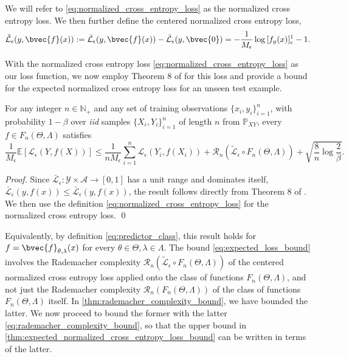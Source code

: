 \documentclass[runningheads, envcountsame, a4paper]{llncs}
\begin{document}
			We will refer to \eqref{eq:normalized_cross_entropy_loss} as the normalized cross entropy loss. We then further define the centered normalized cross entropy loss,
			\begin{equation}
				\tilde{\mathcal{L}}_{\epsilon}(y, \bvec{f}(x)) := \bar{\mathcal{L}}_{\epsilon}(y, \bvec{f}(x)) - \bar{\mathcal{L}}_{\epsilon}(y, \bvec{0}) = - \frac{1}{M_{\epsilon}} \log{ [f_{y}(x)]_{\epsilon}^{1} } - 1.
			\label{eq:centered_normalized_cross_entropy_loss}
			\end{equation}
			
			With the normalized cross entropy loss \eqref{eq:normalized_cross_entropy_loss} as our loss function, we now employ Theorem 8 of \cite{bartlett2002rademacher} for this loss and provide a bound for the expected normalized cross entropy loss for an unseen test example.
			
			\begin{lemma}
				\label{thm:expected_normalized_cross_entropy_loss_bound}
				For any integer $n \in \mathbb{N}_{+}$ and any set of training observations $\{x_{i}, y_{i}\}_{i = 1}^{n}$, with probability $1 - \beta$ over \textit{iid} samples $\{X_{i}, Y_{i}\}_{i = 1}^{n}$ of length $n$ from $\mathbb{P}_{X Y}$, every $f \in F_{n}(\Theta, \Lambda)$ satisfies
				\begin{equation}
					\frac{1}{M_{\epsilon}} \mathbb{E}[\mathcal{L}_{\epsilon}(Y, f(X))] \leq \frac{1}{n M_{\epsilon}} \sum_{i = 1}^{n} \mathcal{L}_{\epsilon}(Y_{i}, f(X_{i})) + \mathcal{R}_{n}(\tilde{\mathcal{L}}_{\epsilon} \circ F_{n}(\Theta, \Lambda)) + \sqrt{\frac{8}{n} \log{\frac{2}{\beta}}}.
				\label{eq:expected_loss_bound}
				\end{equation}
			\end{lemma}
	
			\begin{proof}
				Since $\bar{\mathcal{L}}_{\epsilon} : \mathcal{Y} \times \mathcal{A} \to [0, 1]$ has a unit range and dominates itself, $\bar{\mathcal{L}}_{\epsilon}(y, f(x)) \leq \bar{\mathcal{L}}_{\epsilon}(y, f(x))$, the result follows directly from Theorem 8 of \cite{bartlett2002rademacher}. We then use the definition \eqref{eq:normalized_cross_entropy_loss} for the normalized cross entropy loss.
				\qed
			\end{proof}
			
			Equivalently, by definition \eqref{eq:predictor_class}, this result holds for $f = \bvec{f}_{\theta, \lambda}(x)$ for every $\theta \in \Theta, \lambda \in \Lambda$. The bound \eqref{eq:expected_loss_bound} involves the Rademacher complexity $\mathcal{R}_{n}(\tilde{\mathcal{L}}_{\epsilon} \circ F_{n}(\Theta, \Lambda))$ of the centered normalized cross entropy loss applied onto the class of functions $F_{n}(\Theta, \Lambda)$, and not just the Rademacher complexity $\mathcal{R}_{n}(F_{n}(\Theta, \Lambda))$ of the class of functions $F_{n}(\Theta, \Lambda)$ itself. In \cref{thm:rademacher_complexity_bound}, we have bounded the latter. We now proceed to bound the former with the latter \eqref{eq:rademacher_complexity_bound}, so that the upper bound in \cref{thm:expected_normalized_cross_entropy_loss_bound} can be written in terms of the latter.
			
\end{document}
